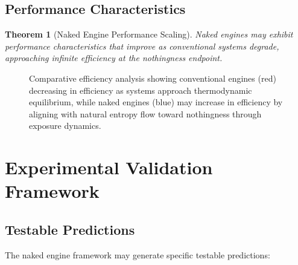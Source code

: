 \documentclass[11pt,a4paper]{article}
\newtheorem{theorem}{Theorem}[section]
\theoremstyle{remark}
\begin{document}
\subsection{Performance Characteristics}

\begin{theorem}[Naked Engine Performance Scaling]
Naked engines may exhibit performance characteristics that improve as conventional systems degrade, approaching infinite efficiency at the nothingness endpoint.
\end{theorem}

\begin{figure}[H]
\centering
{}
\caption{Comparative efficiency analysis showing conventional engines (red) decreasing in efficiency as systems approach thermodynamic equilibrium, while naked engines (blue) may increase in efficiency by aligning with natural entropy flow toward nothingness through exposure dynamics.}
\label{fig:efficiency_comparison}
\end{figure}

\section{Experimental Validation Framework}

\subsection{Testable Predictions}

The naked engine framework may generate specific testable predictions:
\end{document}
